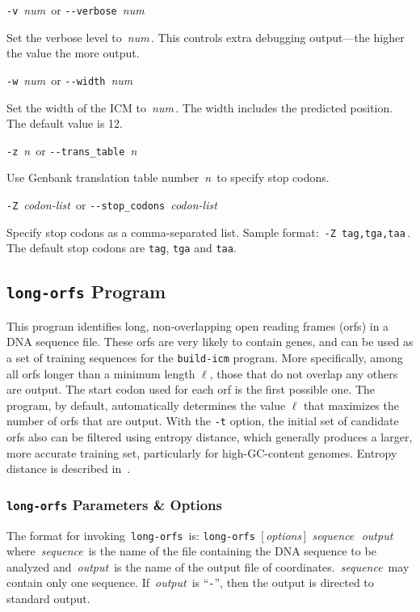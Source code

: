 \documentclass[fleqn,titlepage,11pt]{article}
\def\Desc#1{\,\mbox{\emph{#1}}\,}
\def\Pg#1{\texttt{#1}}
\begin{document}
\exdent
  \verb`-v` \Desc{num} \enskip or \enskip \verb`--verbose` \Desc{num}

  Set the verbose level to \Desc{num}.  This controls extra debugging
  output---the higher the value the more output.

\exdent
  \verb`-w` \Desc{num} \enskip or \enskip \verb`--width` \Desc{num}

  Set the width of the ICM to \Desc{num}.  The width includes
  the predicted position.  The default value is 12.

\exdent
  \verb`-z` \Desc{n} \enskip or \enskip \verb`--trans_table` \Desc{n}

  Use Genbank translation table number \Desc{n} to specify stop codons.

\exdent
  \verb`-Z` \Desc{codon-list} \enskip or \enskip \verb`--stop_codons` \Desc{codon-list}

  Specify stop codons as a comma-separated list.
  Sample format:  \,\verb`-Z tag,tga,taa`\,.
  The default stop codons are \Pg{tag}, \Pg{tga} and \Pg{taa}.
\el

\subsection{\Pg{long-orfs} Program}

This program identifies long, non-overlapping open reading frames (orfs)
in a DNA sequence file.  These orfs are very likely to contain genes,
and can be used as a set of training sequences for the \Pg{build-icm}
program.  More specifically, among all orfs longer than a minimum length
$\ell$, those that do not overlap any others are output.  The start
codon used for each orf is the first possible one.  The program, by
default, automatically determines the value $\ell$ that maximizes the
number of orfs that are output.  With the \Pg{-t} option, the initial
set of candidate orfs also can be filtered using entropy distance, which
generally produces a larger, more accurate training set, particularly
for high-GC-content genomes.  Entropy distance is described in~\cite{med1}.

\subsubsection{\Pg{long-orfs} Parameters \& Options}
The format for invoking \,\Pg{long-orfs}\, is:
\bq
  \Pg{long-orfs}\, [\Desc{options}] \Desc{sequence} \Desc{output}
\eq
where \Desc{sequence} is the name of the file containing the DNA sequence
to be analyzed and \Desc{output} is the name of the output file of
coordinates.  \Desc{sequence} may contain only one sequence.
If \Desc{output} is ``\Pg{-}'', then the output is directed to
standard output.
\end{document}
